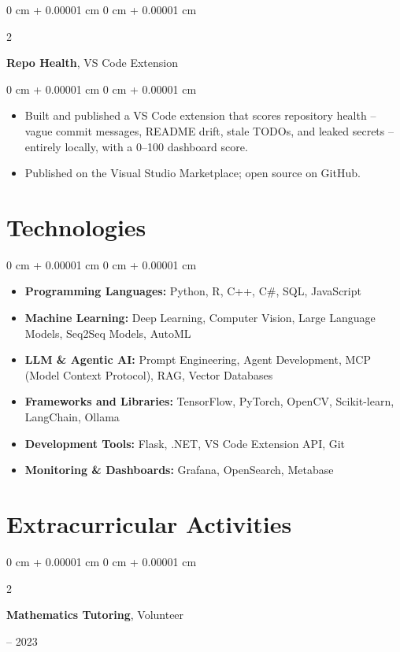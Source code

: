 \documentclass[10pt, letterpaper]{article}
\newenvironment{highlights}{
    \begin{itemize}[
        topsep=0.10 cm,
        parsep=0.10 cm,
        partopsep=0pt,
        itemsep=0pt,
        leftmargin=0 cm + 10pt
    ]
}{
    \end{itemize}
}
\newenvironment{onecolentry}{
    \begin{adjustwidth}{
        0 cm + 0.00001 cm
    }{
        0 cm + 0.00001 cm
    }
}{
    \end{adjustwidth}
}
\newenvironment{twocolentry}[2][]{
    \onecolentry
    \def\secondColumn{#2}
    \setcolumnwidth{\fill, 4.5 cm}
    \begin{paracol}{2}
}{
    \switchcolumn \raggedleft \secondColumn
    \end{paracol}
    \endonecolentry
}
\begin{document}
\begin{twocolentry}{
    2026
}
    \textbf{Repo Health}, VS Code Extension
\end{twocolentry}

\vspace{0.10 cm}
\begin{onecolentry}
    \begin{highlights}
        \item Built and published a VS Code extension that scores repository health -- vague commit messages, README drift, stale TODOs, and leaked secrets -- entirely locally, with a 0--100 dashboard score.
        \item Published on the Visual Studio Marketplace; open source on GitHub.
    \end{highlights}
\end{onecolentry}

\section{Technologies}

\begin{onecolentry}
    \begin{highlights}
        \item \textbf{Programming Languages:} Python, R, C++, C\#, SQL, JavaScript
        \item \textbf{Machine Learning:} Deep Learning, Computer Vision, Large Language Models, Seq2Seq Models, AutoML
        \item \textbf{LLM \& Agentic AI:} Prompt Engineering, Agent Development, MCP (Model Context Protocol), RAG, Vector Databases
        \item \textbf{Frameworks and Libraries:} TensorFlow, PyTorch, OpenCV, Scikit-learn, LangChain, Ollama
        \item \textbf{Development Tools:} Flask, .NET, VS Code Extension API, Git
        \item \textbf{Monitoring \& Dashboards:} Grafana, OpenSearch, Metabase
    \end{highlights}
\end{onecolentry}



\section{Extracurricular Activities}

\begin{twocolentry}{
    2021 -- 2023
}
    \textbf{Mathematics Tutoring}, Volunteer
\end{twocolentry}
\end{document}
